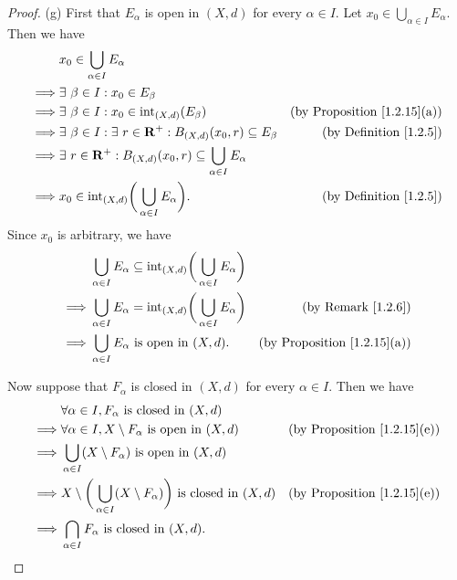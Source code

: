 \begin{proof}{(g)}
    First that \(E_\alpha\) is open in \((X, d)\) for every \(\alpha \in I\).
    Let \(x_0 \in \bigcup_{\alpha \in I} E_\alpha\).
    Then we have
    \begin{align*}
                 & x_0 \in \bigcup_{\alpha \in I} E_\alpha                                                                                      \\
        \implies & \exists\ \beta \in I : x_0 \in E_\beta                                                                                       \\
        \implies & \exists\ \beta \in I : x_0 \in \text{int}_{(X, d)}(E_\beta)                        & \text{(by Proposition \ref{1.2.15}(a))} \\
        \implies & \exists\ \beta \in I : \exists\ r \in \mathbf{R}^+ : B_{(X, d)}(x_0, r) \subseteq E_\beta  & \text{(by Definition \ref{1.2.5})}      \\
        \implies & \exists\ r \in \mathbf{R}^+ : B_{(X, d)}(x_0, r) \subseteq \bigcup_{\alpha \in I} E_\alpha                                           \\
        \implies & x_0 \in \text{int}_{(X, d)}\bigg(\bigcup_{\alpha \in I} E_\alpha\bigg).            & \text{(by Definition \ref{1.2.5})}
    \end{align*}
    Since \(x_0\) is arbitrary, we have
    \begin{align*}
                 & \bigcup_{\alpha \in I} E_\alpha \subseteq \text{int}_{(X, d)}\bigg(\bigcup_{\alpha \in I} E_\alpha\bigg)                                           \\
        \implies & \bigcup_{\alpha \in I} E_\alpha = \text{int}_{(X, d)}\bigg(\bigcup_{\alpha \in I} E_\alpha\bigg)         & \text{(by Remark \ref{1.2.6})}          \\
        \implies & \bigcup_{\alpha \in I} E_\alpha \text{ is open in } (X, d).                                              & \text{(by Proposition \ref{1.2.15}(a))}
    \end{align*}

    Now suppose that \(F_\alpha\) is closed in \((X, d)\) for every \(\alpha \in I\).
    Then we have
    \begin{align*}
                 & \forall \alpha \in I, F_\alpha \text{ is closed in } (X, d)                                                                                  \\
        \implies & \forall \alpha \in I, X \setminus F_\alpha \text{ is open in } (X, d)                              & \text{(by Proposition \ref{1.2.15}(e))} \\
        \implies & \bigcup_{\alpha \in I} (X \setminus F_\alpha) \text{ is open in } (X, d)                                                                     \\
        \implies & X \setminus \bigg(\bigcup_{\alpha \in I} (X \setminus F_\alpha)\bigg) \text{ is closed in } (X, d) & \text{(by Proposition \ref{1.2.15}(e))} \\
        \implies & \bigcap_{\alpha \in I} F_\alpha \text{ is closed in } (X, d).
    \end{align*}
\end{proof}

